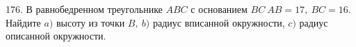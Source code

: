 176. В равнобедренном треугольнике $ABC$ с основанием $BC\ AB=17,\ BC=16.$ Найдите $a)$ высоту из точки $B,\ b)$ радиус вписанной окружности, $c)$ радиус описанной окружности.\\
